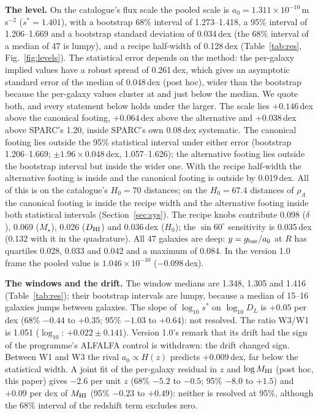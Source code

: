 \documentclass[10pt]{article}
\begin{document}
\textbf{The level.} On the catalogue's flux scale the pooled scale is $a_0=1.311\times10^{-10}$\,m\,s$^{-2}$ ($s^*=1.401$), with a bootstrap 68\% interval of 1.273--1.418, a 95\% interval of 1.206--1.669 and a bootstrap standard deviation of 0.034\,dex (the 68\% interval of a median of 47 is lumpy), and a recipe half-width of 0.128\,dex (Table~\ref{tab:res}, Fig.~\ref{fig:levels}). The statistical error depends on the method: the per-galaxy implied values have a robust spread of 0.261\,dex, which gives an asymptotic standard error of the median of 0.048\,dex (post hoc), wider than the bootstrap because the per-galaxy values cluster at and just below the median. We quote both, and every statement below holds under the larger. The scale lies $+0.146$\,dex above the canonical footing, $+0.064$\,dex above the alternative and $+0.038$\,dex above SPARC's 1.20, inside SPARC's own 0.08\,dex systematic. The canonical footing lies outside the 95\% statistical interval under either error (bootstrap 1.206--1.669; $\pm1.96\times0.048$\,dex, 1.057--1.626); the alternative footing lies outside the bootstrap interval but inside the wider one. With the recipe half-width the alternative footing is inside and the canonical footing is outside by 0.019\,dex. All of this is on the catalogue's $H_0=70$ distances; on the $H_0=67.4$ distances of $\rho_\Lambda$ the canonical footing is inside the recipe width and the alternative footing inside both statistical intervals (Section~\ref{sec:sys}). The recipe knobs contribute 0.098 ($\delta$), 0.069 ($M_\star$), 0.026 ($D_{\rm HI}$) and 0.036\,dex ($H_0$); the $\sin60^\circ$ sensitivity is 0.035\,dex (0.132 with it in the quadrature). All 47 galaxies are deep: $y=g_{\rm bar}/a_0$ at $R$ has quartiles 0.028, 0.033 and 0.042 and a maximum of 0.084. In the version 1.0 frame the pooled value is $1.046\times10^{-10}$ ($-0.098$\,dex).

\textbf{The windows and the drift.} The window medians are 1.348, 1.305 and 1.416 (Table~\ref{tab:res}); their bootstrap intervals are lumpy, because a median of 15--16 galaxies jumps between galaxies. The slope of $\log_{10}s^*$ on $\log_{10}D_L$ is $+0.05$ per dex (68\% $-0.44$ to $+0.35$; 95\% $-1.03$ to $+0.64$): not resolved. The ratio W3/W1 is 1.051 ($\log_{10}$: $+0.022\pm0.141$). Version 1.0's remark that its drift had the sign of the programme's ALFALFA control is withdrawn: the drift changed sign. Between W1 and W3 the rival $a_0\propto H(z)$ predicts $+0.009$\,dex, far below the statistical width. A joint fit of the per-galaxy residual in $z$ and $\log M_{\rm HI}$ (post hoc, this paper) gives $-2.6$ per unit $z$ (68\% $-5.2$ to $-0.5$; 95\% $-8.0$ to $+1.5$) and $+0.09$ per dex of $M_{\rm HI}$ (95\% $-0.23$ to $+0.49$): neither is resolved at 95\%, although the 68\% interval of the redshift term excludes zero.
\end{document}
